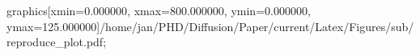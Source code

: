 graphics[xmin=0.000000, xmax=800.000000, ymin=0.000000, ymax=125.000000]{/home/jan/PHD/Diffusion/Paper/current/Latex/Figures/sub/reproduce_plot.pdf}; 
